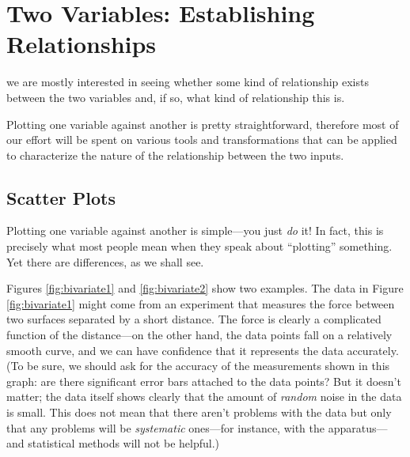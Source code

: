 

\chapter{Two Variables: Establishing Relationships}{}{}
\label{ch:bivariate}

  
 we are mostly
interested in seeing whether some kind of relationship exists between
the two variables and, if so, what kind of relationship this is.

Plotting one variable against another is pretty straightforward,
therefore most of our effort will be spent on various tools and
transformations that can be applied to characterize the nature of the
relationship between the two inputs.

\section{Scatter Plots}

 
Plotting one variable against another is simple---you just
\emph{do} it! In fact, this is precisely what most people mean when
they speak about ``plotting'' something. Yet there are differences,
as we shall see.

Figures \ref{fig:bivariate1} and \ref{fig:bivariate2} show two
examples. The data in Figure \ref{fig:bivariate1} might come from an
experiment that measures the force between two surfaces separated by a
short distance.  The force is clearly a complicated function of the
distance---on the other hand, the data points fall on a relatively
smooth curve, and we can have confidence that it represents the data
accurately. (To be sure, we should ask for the accuracy of the
measurements shown in this graph: are there significant error bars
attached to the data points? But it doesn't matter; the data itself
shows clearly that the amount of \emph{random} noise in the data is
small. This does not mean that there aren't problems with the data but
only that any problems will be \emph{systematic} ones---for instance,
with the apparatus---and statistical methods will not be helpful.)

